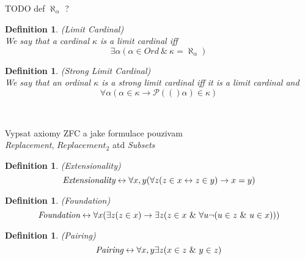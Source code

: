 \documentclass[12pt,a4paper]{article}
\newtheorem{definition}[theorem]{Definition}
\newcommand{\power}[1]{\ensuremath{\mathscr{P}} (#1)}
\renewcommand{\iff}{\leftrightarrow}
\newcommand{\then}{\rightarrow}
\begin{document}
TODO def $\aleph_\alpha$ ?

\begin{definition}{(Limit Cardinal)}\label{def:limit_ordinal}\\
We say that a cardinal $\kappa$ is a \emph{limit cardinal} iff
\begin{equation}
\exists \alpha (\alpha \in Ord\ \&\ \kappa = \aleph_\alpha)
\end{equation}
\end{definition}

\begin{definition}{(Strong Limit Cardinal)}\label{def:limit_ordinal}\\
We say that an ordinal $\kappa$ is a \emph{strong limit cardinal} iff it is a \emph{limit cardinal} and 
\begin{equation}
\forall \alpha (\alpha \in \kappa \then \power(\alpha) \in \kappa)
\end{equation}
\end{definition}
\

Vypsat axiomy ZFC a jake formulace pouzivam\\
\emph{Replacement}, $Replacement_2$ atd
\emph{Subsets}

\begin{definition}{(\emph{Extensionality})}\label{def:extensionality}\\
\begin{equation}
\emph{Extensionality} \iff \forall x, y(\forall z (z \in x \iff z \in y) \then x = y)
\end{equation}
\end{definition}

\begin{definition}{(\emph{Foundation})}\label{def:foundation}\\
\begin{equation}
\emph{Foundation} \iff \forall x (\exists z (z \in x) \then \exists z (z \in x\ \&\ \forall u \neg (u \in z\ \&\ u \in x)))
\end{equation}
\end{definition}

\begin{definition}{(\emph{Pairing})}\label{def:pairing}\\
\begin{equation}
\emph{Pairing} \iff \forall x, y \exists z (x \in z\ \&\ y \in z)
\end{equation}
\end{definition}
\end{document}
